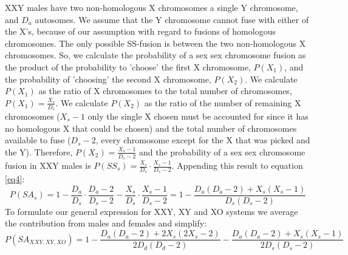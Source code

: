 \documentclass[12pt]{article}
\begin{document}
XXY males have two non-homologous X chromosomes a single Y chromosome, and $D_a$ autosomes. 
We assume that the Y chromosome cannot fuse with either of the X's, because of our assumption with regard to fusions of homologous chromosomes. 
The only possible SS-fusion is between the two non-homologous X chromosomes. 
So, we calculate the probability of a sex sex chromosome fusion as the product of the probability to 'choose' the first X chromosome, $P(X_1)$, and the probability of 'choosing' the second X chromosome, $P(X_2)$. 
We calculate $P(X_1)$ as the ratio of X chromosomes to the total number of chromosomes, $P(X_1) = \frac{X_s}{D_s}$.
We calculate $P(X_2)$ as the ratio of the number of remaining X chromosomes ($X_s - 1$ only the single X chosen must be accounted for since it has no homologous X that could be chosen) and the total number of chromosomes available to fuse ($D_s - 2 $, every chromosome except for the X that was picked and the Y).  
Therefore, $P(X_2) = \frac{X_s - 1}{D_s - 2}$ and the probability of a sex sex chromosome fusion in XXY males is $P(SS_s) = \frac{X_s}{D_s} \cdot \frac{X_s - 1}{D_s - 2}$.
Appending this result to equation \ref{eq4}:
    \begin{equation} \label{eq7}
        P(SA_s) = 1 - \frac{D_a}{D_s} \cdot \frac{D_a - 2}{D_s - 2} - \frac{X_s}{D_s} \cdot \frac{X_s - 1}{D_s - 2} = 1 - \frac{D_a(D_a - 2) + X_s(X_s-1)}{D_s(D_s-2)}
    \end{equation}
To formulate our general expression for XXY, XY and XO systems we average the contribution from males and females and simplify:
\begin{equation} \label{eq8}
P(SA_{XXY, XY, XO}) = 1 -\frac{D_a(D_a-2) + 2X_s(2X_s-2)}{2D_d(D_d-2)} - \frac{D_a(D_a - 2) + X_s(X_s-1)}{2D_s(D_s-2)}
\end{equation}
\end{document}
